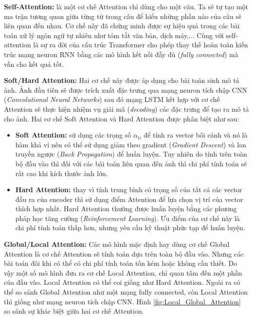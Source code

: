 \documentclass[14pt, a4paper]{article}
\numberwithin{equation}{section}
\numberwithin{algorithm}{section}
\numberwithin{figure}{section}
\numberwithin{dl}{section}
\numberwithin{md}{section}
\numberwithin{bd}{section}
\numberwithin{dn}{section}
\numberwithin{hq}{section}
\begin{document}
    \textbf{Self-Attention:} là một cơ chế Attention chỉ dùng cho một câu. 
    Ta sẽ tự tạo một ma trận tương quan giữa từng từ trong câu để hiểu những phần nào của câu sẽ liên quan đến nhau.
    Cơ chế này đã chứng minh được sự hiệu quả trong các bài toán xử lý ngôn ngữ tự nhiên như tóm tắt văn bản, dịch máy,... 
    Cùng với self-attention là sự ra đời của cấu trúc Transformer \cite{vaswani2017attention} cho phép thay thế hoàn toàn kiến trúc mạng neuron RNN bằng các mô hình kết nối đầy đủ (\textit{fully connected}) mà vẫn cho kết quả tốt.


    \textbf{Soft/Hard Attention:} Hai cơ chế này được áp dụng cho bài toán sinh mô tả ảnh.
    Ảnh đầu tiên sẽ được trích xuất đặc trưng qua mạng neuron tích chập CNN (\textit{Convolutional Neural Networks}) sau đó mạng LSTM kết hợp với cơ chế Attention sẽ thực hiện nhiệm vụ giải mã (\textit{decoding}) các đặc trưng để tạo ra mô tả cho ảnh.
    Hai cơ chế Soft Attention và Hard Attention được phân biệt như sau:

    \begin{itemize}
        \item \textbf{Soft Attention:} sử dụng các trọng số $\alpha_{ti}$ để tính ra vector bối cảnh và nó là hàm khả vi nên có thể sử dụng giảm theo gradient (\textit{Gradient Descent}) và lan truyền ngược (\textit{Back Propagation}) để huấn luyện. 
        Tuy nhiên do tính trên toàn bộ đầu vào thì đối với các bài toán liên quan đến ảnh thì chi phí tính toán sẽ rất cao khi kích thước ảnh lớn.
        \item \textbf{Hard Attention:} thay vì tính trung bình có trọng số của tất cả các vector đầu ra của encoder thì sử dụng điểm Attention để lựa chọn vị trí của vector thích hợp nhất.
        Hard Attention thường được huấn luyện bằng các phương pháp học tăng cường (\textit{Reinforcement Learning}). Ưu điểm của cơ chế này là chi phí tính toán thấp hơn, nhưng yêu cầu kỹ thuật phức tạp để huấn luyện.
    \end{itemize}

    \textbf{Global/Local Attention:} Các mô hình mặc định hay dùng cơ chế Global Attention là cơ chế Attention sẽ tính toán dựa trên toàn bộ đầu vào.
    Nhưng các bài toán đôi khi có thể có chi phí tính toán tốn kém hoặc không cần thiết. Do vậy một số mô hình đưa ra cơ chế Local Attention, chỉ quan tâm đến một phần của đầu vào.
    Local Attention có thể coi giống như Hard Attention. Ngoài ra có thể so sánh Global Attention như một mạng fully connected, còn Local Attention thì giống như mạng neuron tích chập CNN.
    Hình \ref{fig:Local_Global_Attention} so sánh sự khác biệt giữa hai cơ chế Attention.
\end{document}
